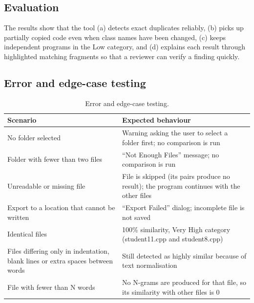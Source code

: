 \documentclass[12pt,a4paper,oneside]{book}
\begin{document}
\subsection{Evaluation}
The results show that the tool (a) detects exact duplicates reliably, (b) picks up partially copied code even when class names have been changed, (c) keeps independent programs in the Low category, and (d) explains each result through highlighted matching fragments so that a reviewer can verify a finding quickly.

\subsection{Error and edge-case testing}
\begin{table}[H]
\centering
\footnotesize
\begin{tabular}{@{}p{6cm}p{8cm}@{}}
\toprule
Scenario & Expected behaviour \\
\midrule
No folder selected & Warning asking the user to select a folder first; no comparison is run \\
Folder with fewer than two files & ``Not Enough Files'' message; no comparison is run \\
Unreadable or missing file & File is skipped (its pairs produce no result); the program continues with the other files \\
Export to a location that cannot be written & ``Export Failed'' dialog; incomplete file is not saved \\
Identical files & 100\% similarity, Very High category (student11.cpp and student8.cpp) \\
Files differing only in indentation, blank lines or extra spaces between words & Still detected as highly similar because of text normalisation \\
File with fewer than N words & No N-grams are produced for that file, so its similarity with other files is 0 \\
\bottomrule
\end{tabular}
\caption{Error and edge-case testing.}
\label{tab:edge}
\end{table}

\end{document}
